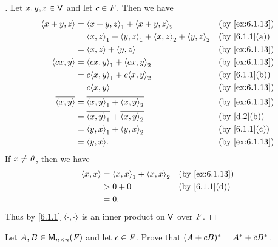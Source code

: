 \begin{proof}[]
	Let \(x, y, z \in \mathsf{V}\) and let \(c \in \mathit{F}\).
	Then we have
	\begin{align*}
		\inn{x + y, z}    & = \inn{x + y, z}_1 + \inn{x + y, z}_2                       &  & \by{ex:6.1.13} \\
		                  & = \inn{x, z}_1 + \inn{y, z}_1 + \inn{x, z}_2 + \inn{y, z}_2 &  & \by{6.1.1}[a]  \\
		                  & = \inn{x, z} + \inn{y, z}                                   &  & \by{ex:6.1.13} \\
		\inn{cx, y}       & = \inn{cx, y}_1 + \inn{cx, y}_2                             &  & \by{ex:6.1.13} \\
		                  & = c \inn{x, y}_1 + c \inn{x, y}_2                           &  & \by{6.1.1}[b]  \\
		                  & = c \inn{x, y}                                              &  & \by{ex:6.1.13} \\
		\conj{\inn{x, y}} & = \conj{\inn{x, y}_1 + \inn{x, y}_2}                        &  & \by{ex:6.1.13} \\
		                  & = \conj{\inn{x, y}_1} + \conj{\inn{x, y}_2}                 &  & \by{d.2}[b]    \\
		                  & = \inn{y, x}_1 + \inn{y, x}_2                               &  & \by{6.1.1}[c]  \\
		                  & = \inn{y, x}.                                               &  & \by{ex:6.1.13}
	\end{align*}
	If \(x \neq \mathit{0}\), then we have
	\begin{align*}
		\inn{x, x} & = \inn{x, x}_1 + \inn{x, x}_2 &  & \by{ex:6.1.13} \\
		           & > 0 + 0                       &  & \by{6.1.1}[d]  \\
		           & = 0.
	\end{align*}
	Thus by \cref{6.1.1} \(\left\langle\cdot, \cdot\right\rangle\) is an inner product on \(\mathsf{V}\) over \(\mathit{F}\).
\end{proof}

\begin{ex}\label{ex:6.1.14}
	Let \(A, B \in \ms[n][n][\F]\) and let \(c \in \mathit{F}\).
	Prove that \((A + cB)^* = A^* + \overline{c} B^*\).
\end{ex}

